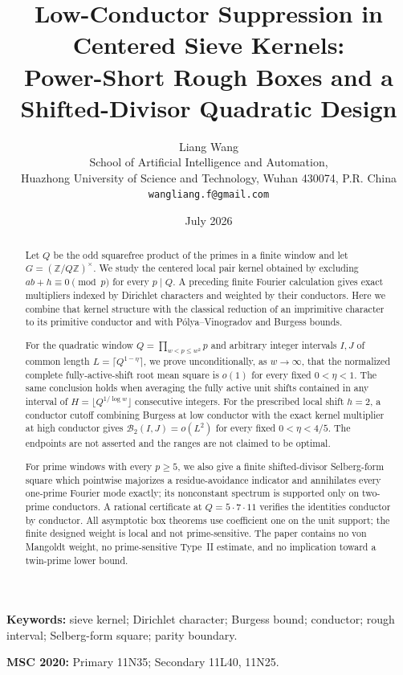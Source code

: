 \documentclass[11pt]{article}
\title{\textbf{Low-Conductor Suppression in Centered Sieve Kernels:}\\
\textbf{Power-Short Rough Boxes and a Shifted-Divisor Quadratic Design}}
\author{Liang Wang\\
\small School of Artificial Intelligence and Automation,\\[-0.2em]
\small Huazhong University of Science and Technology, Wuhan 430074, P.R. China\\
\small \texttt{wangliang.f@gmail.com}}
\date{July 2026}
\theoremstyle{definition}
\theoremstyle{remark}
\newcommand{\Z}{\mathbb Z}
\newcommand{\cB}{\mathcal B}
\begin{document}
\maketitle

\begin{abstract}
Let $Q$ be the odd squarefree product of the primes in a finite window and let $G=(\Z/Q\Z)^\times$.  We study the centered local pair kernel obtained by excluding $ab+h\equiv0\pmod p$ for every $p\mid Q$.  A preceding finite Fourier calculation gives exact multipliers indexed by Dirichlet characters and weighted by their conductors.  Here we combine that kernel structure with the classical reduction of an imprimitive character to its primitive conductor and with P\'olya--Vinogradov and Burgess bounds.

For the quadratic window $Q=\prod_{w<p\le w^2}p$ and arbitrary integer intervals $I,J$ of common length $L=\lceil Q^{1-\eta}\rceil$, we prove unconditionally, as $w\to\infty$, that the normalized complete fully-active-shift root mean square is $o(1)$ for every fixed $0<\eta<1$.  The same conclusion holds when averaging the fully active unit shifts contained in any interval of $H=\lfloor Q^{1/\log w}\rfloor$ consecutive integers.  For the prescribed local shift $h=2$, a conductor cutoff combining Burgess at low conductor with the exact kernel multiplier at high conductor gives $\cB_2(I,J)=o(L^2)$ for every fixed $0<\eta<4/5$.  The endpoints are not asserted and the ranges are not claimed to be optimal.

For prime windows with every $p\ge5$, we also give a finite shifted-divisor Selberg-form square which pointwise majorizes a residue-avoidance indicator and annihilates every one-prime Fourier mode exactly; its nonconstant spectrum is supported only on two-prime conductors.  A rational certificate at $Q=5\cdot7\cdot11$ verifies the identities conductor by conductor.  All asymptotic box theorems use coefficient one on the unit support; the finite designed weight is local and not prime-sensitive.  The paper contains no von Mangoldt weight, no prime-sensitive Type~II estimate, and no implication toward a twin-prime lower bound.
\end{abstract}

\noindent\textbf{Keywords:} sieve kernel; Dirichlet character; Burgess bound; conductor; rough interval; Selberg-form square; parity boundary.

\medskip
\noindent\textbf{MSC 2020:} Primary 11N35; Secondary 11L40, 11N25.









\end{document}
